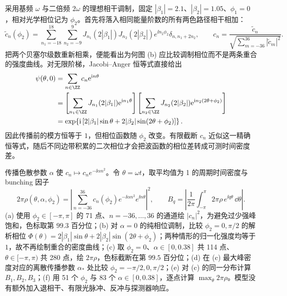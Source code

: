 采用基频 $\omega$ 与二倍频 $2\omega$ 的理想相干调制，固定 $|\beta_1|=2.1$、$|\beta_2|=1.05$、$\phi_1=0$，相对光学相位记为 $\phi_2$。首先将落入相同能量阶数的所有两色路径相干相加：
\[
\widetilde c_n(\phi_2)=\sum_{n_1=-18}^{18}\sum_{n_2=-9}^{9}
J_{n_1}(2|\beta_1|)J_{n_2}(2|\beta_2|)
e^{\ii n_2\phi_2}\delta_{n,n_1+2n_2},\qquad
c_n=\frac{\widetilde c_n}{\sqrt{\sum_{m=-36}^{36}|\widetilde c_m|^2}}.
\]
把两个贝塞尔级数重新相乘，便能看出为何图 (b) 应比较调制相位而不是两条重合的强度曲线。对无限阶梯，Jacobi--Anger 恒等式直接给出
\begin{align*}
 \psi(\theta,0)&=\sum_{n\in\ZZ}c_n\ee^{\ii n\theta}\\
 &=\left[\sum_{n_1\in\ZZ}J_{n_1}(2|\beta_1|)\ee^{\ii n_1\theta}\right]
 \left[\sum_{n_2\in\ZZ}J_{n_2}(2|\beta_2|)\ee^{\ii n_2(2\theta+\phi_2)}\right]\\
 &=\exp\!\left\{\ii\left[2|\beta_1|\sin\theta+2|\beta_2|\sin(2\theta+\phi_2)\right]\right\}.
\end{align*}
因此传播前的模方恒等于 $1$，但相位函数随 $\phi_2$ 改变。有限截断 $c_n$ 近似这一精确恒等式，随后不同边带积累的二次相位才会把波函数的相位差转成可测时间密度差。

传播色散参数 $\alpha$ 使 $c_n\mapsto c_ne^{-\ii\alpha n^2}$。令 $\theta=\omega t$，取平均值为 1 的周期时间密度与 bunching 因子
\[
2\pi\rho(\theta,\alpha,\phi_2)=\left|\sum_{n=-36}^{36}c_n(\phi_2)e^{-\ii\alpha n^2}e^{\ii n\theta}\right|^2,
\qquad
B_q=\left|\frac{1}{2\pi}\int_{-\pi}^{\pi}2\pi\rho\,e^{\ii q\theta}\,\dd \theta\right|.
\]
(a) 使用 $\phi_2\in[-\pi,\pi]$ 的 71 点、$n=-36,\ldots,36$ 的通道绘 $|c_n|^2$，为避免过少强峰饱和，色标取第 $99.3$ 百分位；(b) 对 $\alpha=0$ 的纯相位调制，比较 $\phi_2=0,\pi/2$ 的解析相位 $\Phi(\theta)=2|\beta_1|\sin\theta+2|\beta_2|\sin(2\theta+\phi_2)$；两种情形的归一化强度均等于 $1$，故不再绘制重合的密度曲线；(c) 取 $\phi_2=0$、$\alpha\in[0,0.38]$ 共 114 点、$\theta\in[-\pi,\pi)$ 共 280 点，绘 $2\pi\rho$，色标截断在第 $99.5$ 百分位；(d) 在 (c) 最大峰密度对应的离散传播参数 $\alpha_*$ 处比较 $\phi_2=-\pi/2,0,\pi/2$；(e) 对 (c) 的同一分布计算 $B_1,B_2,B_3$；(f) 用 51 个 $\phi_2$ 与 83 个 $\alpha\in[0,0.38]$，逐点计算 $\max_\theta 2\pi\rho$。模型没有额外加入退相干、有限光脉冲、反冲与探测器响应。



